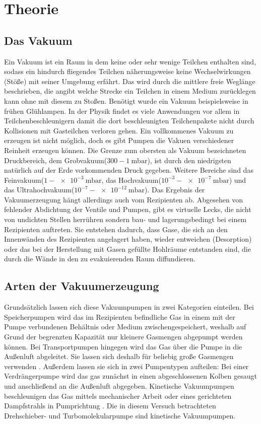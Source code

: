 
\section{Theorie}
\label{sec:Theorie}

\subsection{Das Vakuum}

Ein Vakuum ist ein Raum in dem keine oder sehr wenige Teilchen enthalten sind, sodass ein hindurch fliegendes Teilchen näherungsweise keine Wechselwirkungen (Stöße) mit seiner Umgebung erfährt. Das wird durch die mittlere freie Weglänge beschrieben, die angibt welche Strecke ein Teilchen in einem Medium zurücklegen kann ohne mit diesem zu Stoßen. Benötigt wurde ein Vakuum beispielsweise in frühen Glühlampen. In der Physik findet es viele Anwendungen vor allem in Teilchenbeschleunigern damit die dort beschleunigten Teilchenpakete nicht durch Kollisionen mit Gasteilchen verloren gehen.
Ein vollkommenes Vakuum zu erzeugen ist nicht möglich, doch es gibt Pumpen die Vakuen verschiedener Reinheit erzeugen können. Die Grenze zum obersten als Vakuum bezeichneten Druckbereich, dem Grobvakuum($300 - \SI{1}{\milli\bar}$), ist durch den niedrigsten natürlich auf der Erde vorkommenden Druck gegeben. Weitere Bereiche sind das Feinvakuum($1 - \SI{e-3}{\milli\bar}$, das Hochvakuum($10^{-3} - \SI{e-7}{\milli\bar}$) und das Ultrahochvakuum($10^{-7} - \SI{e-12}{\milli\bar}$). Das Ergebnis der Vakuumerzeugung hängt allerdings auch vom Rezipienten ab. Abgesehen von fehlender Abdichtung der Ventile und Pumpen, gibt es virtuelle Lecks, die nicht von undichten Stellen herrühren sondern bau- und lagerungsbedingt bei einem Rezipienten auftreten. Sie entstehen dadurch, dass Gase, die sich an den Innenwänden des Rezipienten angelagert haben, wieder entweichen (Desorption) oder das bei der Herstellung mit Gasen gefüllte Hohlräume entstanden sind, die durch die Wände in den zu evakuierenden Raum diffundieren.
\subsection{Arten der Vakuumerzeugung}

Grundsätzlich lassen sich diese Vakuumpumpen in zwei Kategorien einteilen.
Bei Speicherpumpen wird das im Rezipienten befindliche Gas in einem mit der Pumpe verbundenen Behältnis oder Medium zwischengespeichert, weshalb auf Grund der begrenzten Kapazität nur kleinere Gasmengen abgepumpt werden können.
Bei Transportpumpen hingegen wird das Gas über die Pumpe in die Außenluft abgeleitet. Sie lassen sich deshalb für beliebig große Gasmengen verwenden \cite{Jena}. 
Außerdem lassen sie sich in zwei Pumpentypen aufteilen:\newline
Bei einer Verdrängerpumpe wird das gas zunächst in einen abgeschlossenen Kolben gesaugt und anschließend an die Außenluft abgegeben.\newline
Kinetische Vakuumpumpen beschleunigen das Gas mittels mechanischer Arbeit oder eines gerichteten Dampfstrahls in Pumprichtung \cite{Pfeiffer}.
Die in diesem Versuch betrachteten Drehschieber- und Turbomolekularpumpe sind kinetische Vakuumpumpen.

